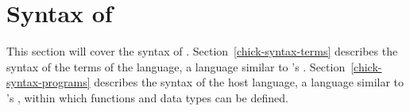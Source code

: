 \section{Syntax of \Chick{}}\label{chick-syntax}

This section will cover the syntax of \Chick{}.
Section~\ref{chick-syntax-terms} describes the syntax of the terms of the
language, a language similar to \Coq{}'s \Gallina{}.
Section~\ref{chick-syntax-programs} describes the syntax of the host language, a
language similar to \Coq{}'s \Vernacular{}, within which functions and data
types can be defined.




